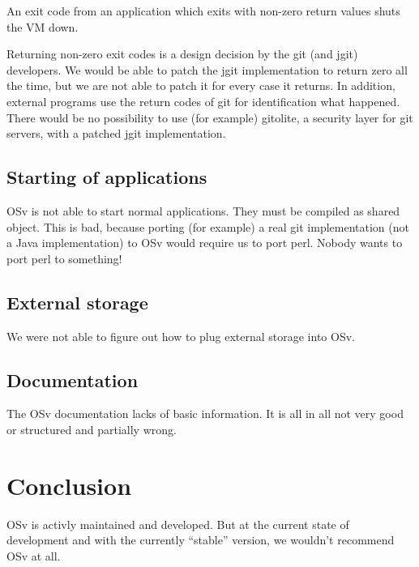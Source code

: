         An exit code from an application which exits with non-zero return values
        shuts the VM down.

        Returning non-zero exit codes is a design decision by the git (and jgit)
        developers. We would be
        able to patch the jgit implementation to return zero all the time, but
        we are not able to patch it for every case it returns. In addition,
        external programs use the return codes of git for identification what
        happened. There would be no possibility to use (for example) gitolite, a
        security layer for git servers, with a patched jgit implementation.

    \section{Starting of applications}

        OSv is not able to start normal applications. They must be compiled as
        shared object. This is bad, because porting (for example) a real git
        implementation (not a Java implementation) to OSv would require us to
        port perl. Nobody wants to port perl to something!

    \section{External storage}

        We were not able to figure out how to plug external storage into OSv.

    \section{Documentation}

        The OSv documentation lacks of basic information. It is all in all not
        very good or structured and partially wrong.

\chapter{Conclusion}

    OSv is activly maintained and developed. But at the current state of
    development and with the currently ``stable'' version, we wouldn't recommend
    OSv at all.
